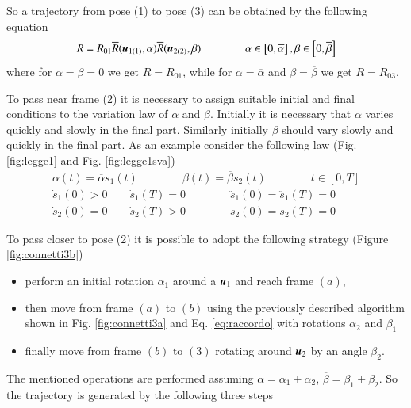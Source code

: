 So a trajectory from pose (1) to pose (3) can be obtained by the following equation
\begin{equation}
    R = R_{01}\overline{R}({\boldsymbol{u}}_{1(1)},\alpha)\overline{R}({\boldsymbol{u}}_{2(2)},\beta) 
    \qquad\qquad 
    \alpha \in \left[ 0, \overline{\alpha} \right], \beta \in \left[ 0, \overline{\beta} \right]
    \label{eq:raccordo}
\end{equation}
where for $\alpha=\beta=0$ we get $R=R_{01}$, while for $\alpha=\overline{\alpha}$ and $\beta=\overline{\beta}$ we get  $R=R_{03}$.

To pass near frame (2) it is necessary to assign suitable initial and final conditions to the variation law of  $\alpha$ and $\beta$. Initially it is necessary that $\alpha$ varies quickly and slowly in the final part. Similarly initially $\beta$ should vary slowly and quickly in the final part. As an example consider the following law (Fig. \ref{fig:legge1} and Fig. \ref{fig:legge1sva})
\begin{equation}
    \begin{array}{c}
        \alpha(t) = \overline{\alpha} s_{1}(t)
        \qquad\qquad
        \beta(t)=\overline{\beta} s_{2}(t)
        \qquad\qquad
        t \in \left[ 0, T \right] \\[2ex]
        \dot{s}_1(0)>0 \qquad \dot{s}_1(T)=0
        \qquad\qquad
        \ddot{s}_1(0)=\ddot{s}_1(T)=0\\[2ex]
        \dot{s}_2(0)=0 \qquad \dot{s}_2(T)>0
        \qquad\qquad
        \ddot{s}_2(0)=\ddot{s}_2(T)=0
    \end{array}
    \label{eq:cambiaA,B}
\end{equation}

To pass closer to pose (2) it is possible to adopt the following strategy (Figure \ref{fig:connetti3b})
\begin{itemize}
    \item perform an initial rotation  $\alpha_1$ around a ${\boldsymbol{u}}_1$ and reach frame $(a)$,
    \item then move from frame  $(a)$ to $(b)$ using the previously described algorithm shown in Fig. \ref{fig:connetti3a} and Eq. \ref{eq:raccordo} with rotations $\alpha_2$ and $\beta_1$
    \item finally move from frame $(b)$ to $(3)$ rotating around ${\boldsymbol{u}}_2$ by an angle $\beta_2$.
\end{itemize}
The mentioned operations are performed assuming $\overline{\alpha}=\alpha_1+\alpha_2$, $\overline{\beta}=\beta_1+\beta_2$.
So the trajectory is generated by the following three steps

